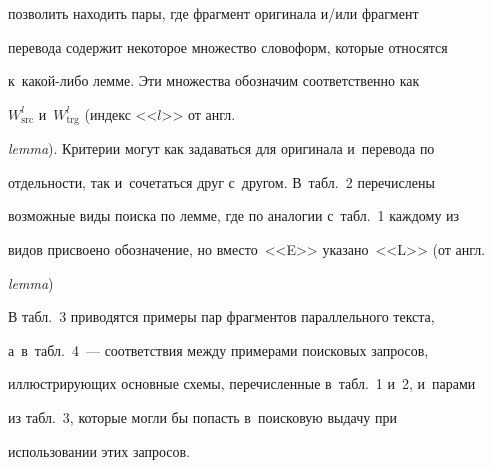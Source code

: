 позволить находить пары, где фрагмент оригинала и\!/\!или фрагмент 


перевода содержит некоторое множество словоформ, которые относятся 


к~ка\-кой-ли\-бо лемме. Эти множества обозначим соответственно как 


$W_{\mathrm{src}}^l$ и~$W_{\mathrm{trg}}^l$ (индекс <<$l$>> от англ.\ 


\textit{lemma}). Критерии могут как задаваться для оригинала и~перевода по 


отдельности, так и~сочетаться друг с~другом. В~табл.~2 пе\-ре\-чис\-ле\-ны 


возможные виды поиска по лемме, где по аналогии с~табл.~1 каждому из 


видов присвоено обозначение, но вместо~<<E>> указано~<<L>> (от англ.\ 


\textit{lemma}) 








В табл.~3 приводятся примеры пар фрагментов параллельного текста, 


а~в~табл.~4~--- соответствия между примерами поисковых запросов, 


иллюстрирующих основные схемы, перечисленные в~табл.~1 и~2, и~парами 


из табл.~3, которые могли бы попасть в~поисковую выдачу при 


использовании этих запросов.


